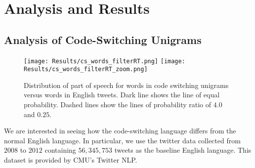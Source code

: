\documentclass[conference]{IEEEtran}
\begin{document}








\section{Analysis and Results}

\subsection{Analysis of Code-Switching Unigrams}

\begin{figure}[H]
	\centering
	\texttt{[image: Results/cs\_words\_filterRT.png]}
	\texttt{[image: Results/cs\_words\_filterRT\_zoom.png]}
	\caption{Distribution of part of speech for words in code switching unigrams versus words in English tweets. Dark line shows the line of equal probability. Dashed lines show the lines of probability ratio of $4.0$ and $0.25$.}
	\label{fig:cs_words}
\end{figure}

We are interested in seeing how the code-switching language differs from the normal English language. In particular, we use the twitter data collected from $2008$ to $2012$ containing $56,345,753$ tweets as the baseline English language. This dataset is provided by CMU's Twitter NLP.

\end{document}

